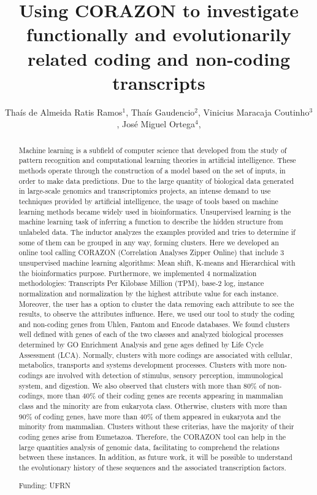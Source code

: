 \documentclass[twoside]{article}
\title{\vspace{-15mm}\fontsize{24pt}{10pt}\selectfont\textbf{ Using CORAZON to investigate functionally and evolutionarily related coding and non-coding transcripts }} %
\author{ Thaís de Almeida Ratis Ramos$^{1}$, Thaís Gaudencio$^{2}$, Vinicius Maracaja Coutinho$^{3}$, José Miguel Ortega$^{4}$, }
\affil{ 1 UFRN

2 UFPB

3 Universidad Mayor

4 Universidade Federal de Minas Gerais Laboratório de Biodados.

 }
\date{}
\begin{document}
  
  
  \maketitle %
  
  
  \thispagestyle{fancy} %
  
  
  \begin{abstract}
  Machine learning is a subfield of computer science that developed from the study of pattern recognition and computational learning theories in artificial intelligence. These methods operate through the construction of a model based on the set of inputs, in order to make data predictions. Due to the large quantity of biological data generated in large-scale genomics and transcriptomics projects, an intense demand to use techniques provided by artificial intelligence, the usage of tools based on machine learning methods became widely used in bioinformatics. Unsupervised learning is the machine learning task of inferring a function to describe the hidden structure from unlabeled data. The inductor analyzes the examples provided and tries to determine if some of them can be grouped in any way, forming clusters. Here we developed an online tool calling CORAZON (Correlation Analyses Zipper Online) that include 3 unsupervised machine learning algorithms: Mean shift,  K-means and Hierarchical with the bioinformatics purpose. Furthermore, we implemented 4 normalization methodologies: Transcripts Per Kilobase Million (TPM), base-2 log, instance normalization and normalization by the highest attribute value for each instance. Moreover, the user has a option to cluster the data removing each attribute to see the results, to observe the attributes influence.  Here, we used our tool to study the coding and non-coding genes from Uhlen, Fantom and Encode databases. We found clusters well defined with genes of each of the two classes and analyzed biological processes determined by GO Enrichment Analysis and gene ages defined by Life Cycle Assessment (LCA). Normally, clusters with more codings are associated with cellular, metabolics, transports and systems development processes. Clusters with more non-codings are involved with detection of stimulus, sensory perception, immunological system, and digestion. We also observed that clusters with more than 80\% of non-codings, more than 40\% of their coding genes are recents appearing in mammalian class and the minority are from eukaryota class. Otherwise, clusters with more than 90\% of coding genes, have more than 40\% of them appeared in eukaryota and the minority from mammalian. Clusters without these criterias, have the majority of their coding genes arise from Eumetazoa. Therefore, the CORAZON tool can help in the large quantities analysis of genomic data, facilitating to comprehend the relations between these instances. In addition, as future work, it will be possible to understand the evolutionary history of these sequences and the associated transcription factors.
  
  Funding: UFRN \\ 
  \end{abstract}
  
\end{document}

